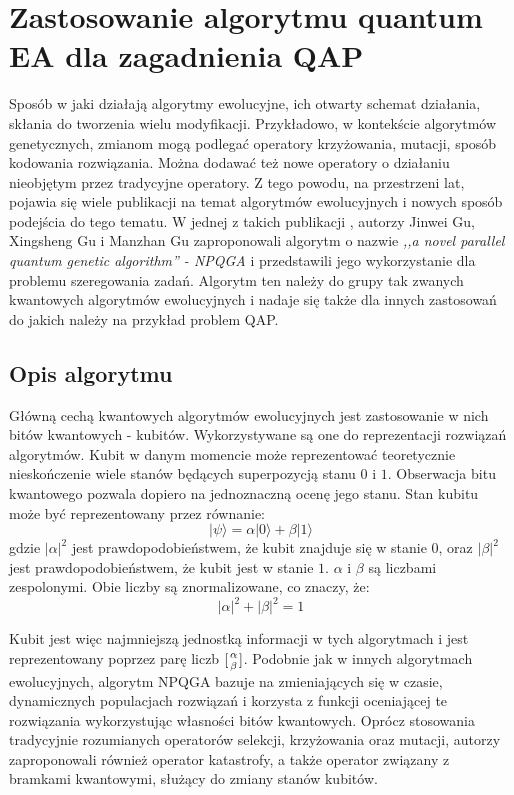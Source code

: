 \chapter{Zastosowanie algorytmu quantum EA dla zagadnienia QAP}
\label{cha:qap_ea}
Sposób w jaki działają algorytmy ewolucyjne, ich otwarty schemat działania, skłania do tworzenia wielu modyfikacji. Przykładowo, w kontekście algorytmów genetycznych, zmianom mogą podlegać operatory krzyżowania, mutacji, sposób kodowania rozwiązania. Można dodawać też nowe operatory o działaniu nieobjętym przez tradycyjne operatory. Z tego powodu, na przestrzeni lat, pojawia się wiele publikacji na temat algorytmów ewolucyjnych i nowych sposób podejścia do tego tematu. W jednej z takich publikacji \cite{NPQGA}, autorzy Jinwei Gu, Xingsheng Gu i Manzhan Gu zaproponowali algorytm o nazwie \textit{,,a novel parallel quantum genetic algorithm'' - NPQGA} i przedstawili jego wykorzystanie dla problemu szeregowania zadań.  Algorytm ten należy do grupy tak zwanych kwantowych algorytmów ewolucyjnych i nadaje się także dla innych zastosowań do jakich należy na przykład problem QAP.

\section{Opis algorytmu}
Główną cechą kwantowych algorytmów ewolucyjnych jest zastosowanie w nich bitów kwantowych - kubitów. Wykorzystywane są one do reprezentacji rozwiązań algorytmów. Kubit w danym momencie może reprezentować teoretycznie nieskończenie wiele stanów będących superpozycją stanu $0$ i $1$. Obserwacja bitu kwantowego pozwala dopiero na jednoznaczną ocenę jego stanu. Stan kubitu może być reprezentowany przez równanie:
\newline
\begin{equation}
|\psi\rangle=\alpha|0\rangle+\beta|1\rangle
\end{equation}
\newline
gdzie $|\alpha|^2$ jest prawdopodobieństwem, że kubit znajduje się w stanie $0$, oraz $|\beta|^2$ jest prawdopodobieństwem, że kubit jest w stanie $1$. $\alpha$ i $\beta$ są liczbami zespolonymi. Obie liczby są znormalizowane, co znaczy, że:
\newline
\begin{equation}
|\alpha|^2+|\beta|^2=1
\end{equation}
\newline 

Kubit jest więc najmniejszą jednostką informacji w tych algorytmach i jest reprezentowany poprzez parę liczb $[{\alpha \atop \beta}]$. Podobnie jak w innych algorytmach ewolucyjnych, algorytm NPQGA bazuje na zmieniających się w czasie, dynamicznych populacjach rozwiązań i korzysta z funkcji oceniającej te rozwiązania wykorzystując własności bitów kwantowych. Oprócz stosowania tradycyjnie rozumianych operatorów selekcji, krzyżowania oraz mutacji, autorzy zaproponowali również operator katastrofy, a także operator związany z bramkami kwantowymi, służący do zmiany stanów kubitów.

